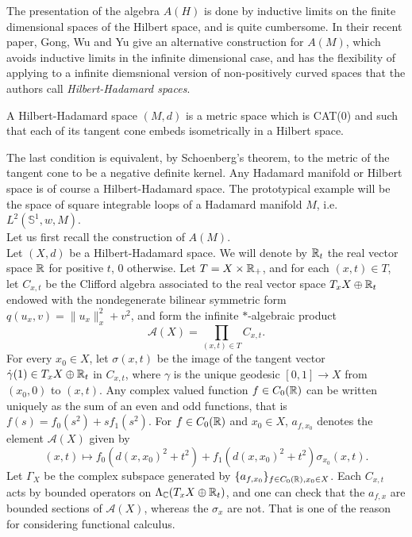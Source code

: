 The presentation of the algebra $A(H)$ is done by inductive limits on the finite dimensional spaces of the Hilbert space, and is quite cumbersome. In their recent paper, Gong, Wu and Yu give an alternative construction for $A(M)$, which avoids inductive limits in the infinite dimensional case, and has the flexibility of applying to a infinite diemsnional version of non-positively curved spaces that the authors call \textit{Hilbert-Hadamard spaces}.

\begin{definition}
A Hilbert-Hadamard space $(M,d)$ is a metric space which is CAT(0) and such that each of its tangent cone embeds isometrically in a Hilbert space. 
\end{definition}

The last condition is equivalent, by Schoenberg's theorem, to the metric of the tangent cone to be a negative definite kernel. Any Hadamard manifold or Hilbert space is of course a Hilbert-Hadamard space. The prototypical example will be the space of square integrable loops of a Hadamard manifold $M$, i.e. $L^2(\mathbb S^1, w, M)$. \\

Let us first recall the construction of $A(M)$.\\

Let $(X,d)$ be a Hilbert-Hadamard space. We will denote by $\mathbb R_t$ the real vector space $\mathbb R$ for positive $t$, $0$ otherwise. Let $T= X\times \mathbb R_+$, and for each $(x,t)\in T$, let $C_{x,t}$ be the Clifford algebra associated to the real vector space $T_x X \oplus \mathbb R_t$ endowed with the nondegenerate bilinear symmetric form $q(u_x,v)= \|u_x\|_x^2+ v^2$, and form the infinite %
$*$-algebraic product 
\[\mathcal A(X) = \prod_{(x,t)\in T} C_{x,t}.\]
 For every $x_0\in X$, let $\sigma(x,t)$ be the image of the tangent vector $\dot\gamma(1)\in T_x X \oplus \mathbb R_t$ in $C_{x,t}$, where $\gamma$ is the unique geodesic $[0,1]\rightarrow X$ from $(x_0,0)$ to $(x,t)$. Any complex valued function $f\in C_0(\mathbb R) $ can be written uniquely as the sum of an even and odd functions, that is $f(s) = f_0(s^2)+sf_1(s^2)$. For $f\in C_0(\mathbb R)$ and $x_0\in X$, $a_{f,x_0}$ denotes the element $\mathcal A(X)$ given by 
 \[ (x,t) \mapsto f_0(d(x,x_0)^2+t^2) +  f_1(d(x,x_0)^2+t^2) \sigma_{x_0}(x,t).\]
Let $\Gamma_X$ be the complex subspace generated by $\{a_{f,x_0} \}_{f\in C_0(\mathbb R) , x_0\in X}$. Each $C_{x,t}$ acts by bounded operators on $\Lambda_\mathbb C (T_x X \oplus \mathbb R_t)$, and one can check that the $a_{f,x}$ are bounded sections of $\mathcal A(X)$, whereas the $\sigma_x$ are not. That is one of the reason for considering functional calculus.

